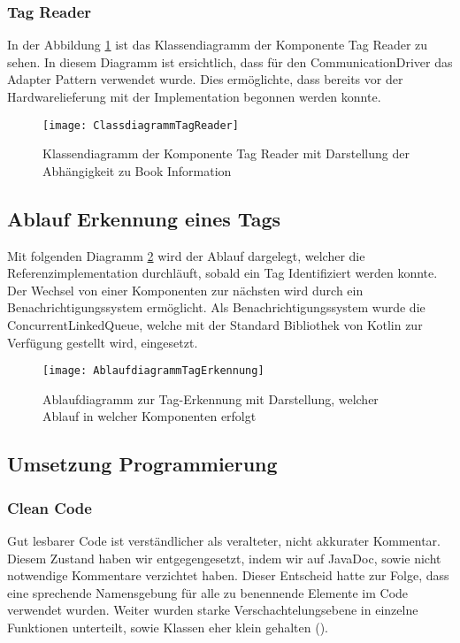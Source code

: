 \subsubsection{Tag Reader}
In der Abbildung \ref{fig:ClassTagReader} ist das Klassendiagramm der Komponente Tag Reader zu sehen.
In diesem Diagramm ist ersichtlich, dass für den CommunicationDriver das Adapter Pattern verwendet wurde. Dies ermöglichte, dass bereits vor der Hardwarelieferung mit der Implementation begonnen werden konnte. 

\begin{figure}[htb]
	\centering
	\texttt{[image: ClassdiagrammTagReader]}
	\caption{Klassendiagramm der Komponente Tag Reader mit Darstellung der Abhängigkeit zu Book Information}
	\label{fig:ClassTagReader}
\end{figure}


\subsection{Ablauf Erkennung eines Tags}
Mit folgenden Diagramm \ref{fig:AblaufdiagrammTagErkennung} wird der Ablauf dargelegt, welcher die Referenzimplementation durchläuft, sobald ein Tag Identifiziert werden konnte. Der Wechsel von einer Komponenten zur nächsten wird durch ein Benachrichtigungssystem ermöglicht. Als Benachrichtigungssystem wurde die ConcurrentLinkedQueue, welche mit der Standard Bibliothek von Kotlin zur Verfügung gestellt wird, eingesetzt. 
\begin{figure}[htb]
	\centering
	\texttt{[image: AblaufdiagrammTagErkennung]}
	\caption{Ablaufdiagramm zur Tag-Erkennung mit Darstellung, welcher Ablauf in welcher Komponenten erfolgt}
	\label{fig:AblaufdiagrammTagErkennung}
\end{figure}

\clearpage
\subsection{Umsetzung Programmierung}
\subsubsection{Clean Code}
Gut lesbarer Code ist verständlicher als veralteter, nicht akkurater Kommentar. Diesem Zustand haben wir entgegengesetzt, indem wir auf JavaDoc, sowie nicht notwendige Kommentare verzichtet haben. Dieser Entscheid hatte zur Folge, dass eine sprechende Namensgebung für alle zu benennende Elemente im Code verwendet wurden. Weiter wurden starke Verschachtelungsebene in einzelne Funktionen unterteilt, sowie Klassen eher klein gehalten (\cite{martin2009clean}).

